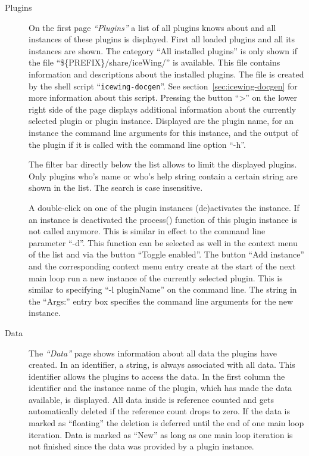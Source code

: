 \begin{description}
\item[Plugins] On the first page \emph{``Plugins''} a list of all
  plugins \icewing{} knows about and all instances of these plugins
  is displayed. First all loaded plugins and all its instances are
  shown. The category ``All installed plugins'' is only shown if the
  file ``\$\{PREFIX\}/share/iceWing/'' is
  available. This file contains information and descriptions about
  the installed plugins. The file is created by the shell script
  ``\verb|icewing-docgen|''. See
  section~\ref{sec:icewing-docgen} for more information about this
  script. Pressing the button ``\textgreater{}'' on the lower right
  side of the page displays additional information about the
  currently selected plugin or plugin instance. Displayed are the
  plugin name, for an instance the command line arguments for this
  instance, and the output of the plugin if it is called with the
  command line option ``-h''.

  The filter bar directly below the list allows to limit the
  displayed plugins. Only plugins who's name or who's help string
  contain a certain string are shown in the list. The search is case
  insensitive.

  A double-click on one of the plugin instances (de)activates the
  instance. If an instance is deactivated the process() function of
  this plugin instance is not called anymore. This is similar in
  effect to the command line parameter ``-d''. This function can be
  selected as well in the context menu of the list and via the
  button ``Toggle enabled''. The button ``Add instance'' and the
  corresponding context menu entry create at the start of the next
  main loop run a new instance of the currently selected
  plugin. This is similar to specifying ``-l pluginName'' on the
  command line. The string in the ``Args:'' entry box specifies the
  command line arguments for the new instance.

\item[Data] The \emph{``Data''} page shows information about all data
  the plugins have created. In \icewing{} an identifier, a string, is
  always associated with all data. This identifier allows the plugins
  to access the data. In the first column the identifier and the
  instance name of the plugin, which has made the data available, is
  displayed. All data inside \icewing{} is reference counted and gets
  automatically deleted if the reference count drops to zero. If the
  data is marked as ``floating'' the deletion is deferred until the
  end of one main loop iteration. Data is marked as ``New'' as long
  as one main loop iteration is not finished since the data was
  provided by a plugin instance.


\end{description}

